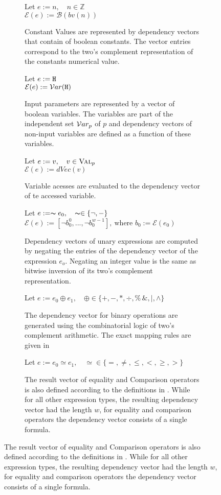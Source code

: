 \begin{figure}
    \begin{subfigure}{1\textwidth}
    \centering
        Let $e := n, \quad n \in \mathbb{Z}$\\
        $\mathcal{E}(e) := \mathcal{B}(bv(n))$
        \caption{Constant Values are represented by dependency vectors that contain of boolean constants. The vector entries correspond to the two's complement representation of the constants numerical value.}
    \end{subfigure}
    \bigskip
    \begin{subfigure}{1\textwidth}
        \centering
        Let $e := \mathtt{H}$\\
        $\mathcal{E}(e) := \mathcal{V}ar(\mathtt{H})$
        \caption{Input parameters are represented by a vector of boolean variables. The variables are part of the independent set $\mathcal{V}ar_p$ of $p$ and dependency vectors of non-input variables are defined as a function of these variables.}
    \end{subfigure}
    \bigskip
    \begin{subfigure}{1\textwidth}
        \centering
        Let $e := v, \quad v \in \textsc{Val}_p$\\
        $\mathcal{E}(e) := dVec(v)$
        \caption{Variable acesses are evaluated to the dependency vector of te accessed variable.}
    \end{subfigure}
    \bigskip
    \begin{subfigure}{1\textwidth}
    \centering
        Let $e := \thicksim e_0, \quad \thicksim \in \{ \lnot, - \}$\\
        $\mathcal{E}(e) := [\lnot b_0^0 , ... , \lnot b_0^{w-1}], \: \text{where } b_0 := \mathcal{E}(e_0)$
       \caption{Dependency vectors of unary expressions are computed by negating the entries of the dependency vector of the expression $e_o$. Negating an integer value is the same as bitwise inversion of its two's complement representation.}
    \end{subfigure}
    \bigskip
    \begin{subfigure}{1\textwidth}
        \centering
        Let $e := e_0 \oplus e_1, \quad \oplus \in \{ +, -, *, \div, \% \, \&, |, \wedge \}$\\
        \caption{The dependency vector for binary operations are generated using the combinatorial logic of two's complement arithmetic. The exact mapping rules are given in }
    \end{subfigure}
    \bigskip
    \begin{subfigure}{1\textwidth}
        \centering
        Let $e := e_0 \simeq e_1, \quad \simeq \in \{ =, \neq, \leq, <, \geq, > \}$\\
        \caption{The result vector of equality and Comparison operators is also defined according to the definitions in . While for all other expression types, the resulting dependency vector had the length $w$, for equality and comparison operators the dependency vector consists of a single formula.}
    \end{subfigure}


\end{figure}
